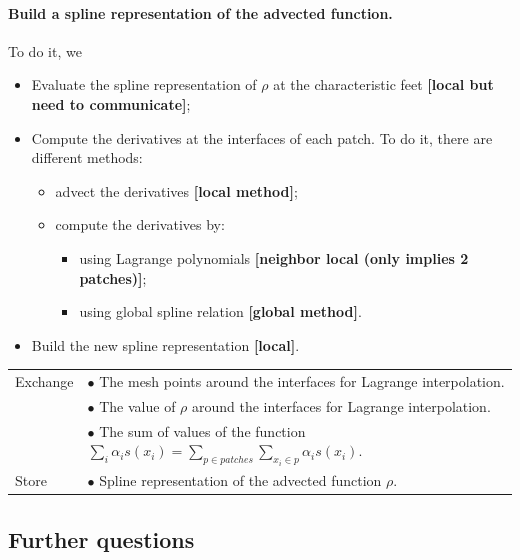 \documentclass[presentation.tex]{subfiles}
\begin{document}
\paragraph{Build a spline representation of the advected function.}
To do it, we 
\begin{itemize}
	\item Evaluate the spline representation of $\rho$ at the characteristic feet \textbf{[local but need to communicate]}; 
	\item Compute the derivatives at the interfaces of each patch. To do it, there are different methods: 
	\begin{itemize}
		\item advect the derivatives \textbf{[local method]}; 
		\item compute the derivatives by: 
		\begin{itemize}
			\item using Lagrange polynomials \textbf{[neighbor local (only implies 2 patches)]}; 
			\item using global spline relation \textbf{[global method]}. 
		\end{itemize}
	\end{itemize}
	\item Build the new spline representation \textbf{[local]}.
\end{itemize}


\begin{center}
\begin{tabular}{ |l|l| } 
 \hline
 Exchange 	&  $\bullet$ The mesh points around the interfaces for Lagrange interpolation. \\
 			&  $\bullet$ The value of $\rho$ around the interfaces for Lagrange interpolation. \\
 		 	&  $\bullet$ The sum of values of the function $\sum_i \alpha_i s(x_i) = \sum_{p \in patches}\sum_{x_i\in p} \alpha_i s(x_i)$. \\
 \hline
 Store 	& $\bullet$ Spline representation of the advected function $\rho$. \\
 \hline
\end{tabular}
\end{center}




\subsection{Further questions}
\end{document}
